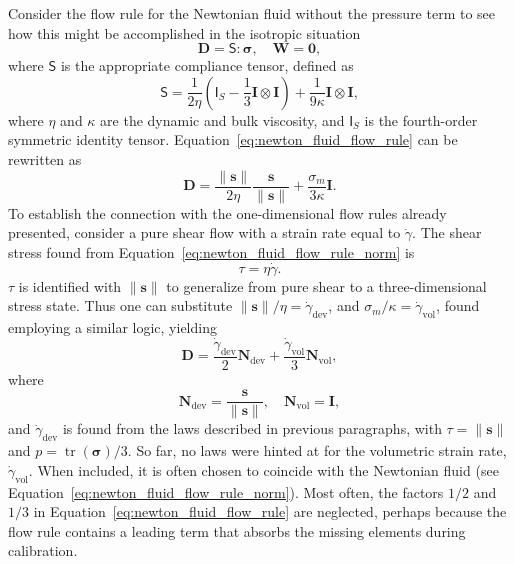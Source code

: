 Consider the flow rule for the Newtonian fluid without the pressure term to see how this might be accomplished in the isotropic situation
\begin{equation}
	\label{eq:newton_fluid_flow_rule}
	\bm D = \bm{\mathsf S}: \bm \sigma,\quad \bm W = \bm 0,
\end{equation}
where $\bm{\mathsf S}$ is the appropriate compliance tensor, defined as
\begin{equation}
	\bm{\mathsf S} = \frac{1}{2\eta} \left(\bm{\mathsf I}_S - \frac{1}{3} \bm I\otimes\bm I\right) + \frac{1}{9\kappa} \bm I\otimes \bm I,
\end{equation}
where $\eta$ and $\kappa$ are the dynamic and bulk viscosity, and $\bm{\mathsf I}_S$ is the fourth-order symmetric identity tensor.
Equation~\eqref{eq:newton_fluid_flow_rule} can be rewritten as
\begin{equation}
	\label{eq:newton_fluid_flow_rule_norm}
	\bm D = \frac{\|\bm s\|}{2 \eta} \frac{\bm s}{\|\bm s\|} + \frac{\sigma_m}{3\kappa} \bm I.
\end{equation}
To establish the connection with the one-dimensional flow rules already presented, consider a pure shear flow with a strain rate equal to $\dot \gamma$.
The shear stress found from Equation~\eqref{eq:newton_fluid_flow_rule_norm} is
\begin{equation}
	\tau = \eta \dot\gamma.
\end{equation}
$\tau$ is identified with $\|\bm s\|$ to generalize from pure shear to a three-dimensional stress state.
Thus one can substitute $\|\bm s\|/\eta = \dot\gamma_\text{dev}$, and $\sigma_m /\kappa = \dot\gamma_\text{vol}$, found employing a similar logic, yielding
\begin{equation}
	\bm D = \frac{\dot \gamma_\text{dev} }{2} \bm N_\text{dev} + \frac{\dot\gamma_\text{vol} }{3} \bm N_\text{vol},
\end{equation}
where
\begin{equation}
	\label{eq:flow_rule_directions}
	\bm N_\text{dev} = \frac{\bm s}{\|\bm s\|},\quad \bm N_\text{vol} = \bm I,
\end{equation}
and $\dot \gamma_\text{dev}$ is found from the laws described in previous paragraphs, with $\tau=\|\bm s\|$ and $p = \operatorname{tr}(\bm \sigma)/3$.
So far, no laws were hinted at for the volumetric strain rate, $\dot \gamma_\text{vol}$.
When included, it is often chosen to coincide with the Newtonian fluid (see Equation~\eqref{eq:newton_fluid_flow_rule_norm}).
Most often, the factors $1/2$ and $1/3$ in Equation~\eqref{eq:newton_fluid_flow_rule} are neglected, perhaps because the flow rule contains a leading term that absorbs the missing elements during calibration.

